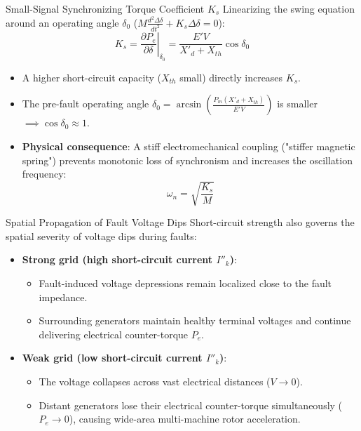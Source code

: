 \begin{frame}{Small-Signal Synchronizing Torque Coefficient $K_s$}
Linearizing the swing equation around an operating angle $\delta_0$ ($M \frac{d^2\Delta\delta}{dt^2} + K_s \Delta\delta = 0$):
$$K_s = \left.\frac{\partial P_e}{\partial\delta}\right|_{\delta_0} = \frac{E' V}{X'_d + X_{th}} \cos \delta_0$$
\begin{itemize}
    \item A higher short-circuit capacity ($X_{th}$ small) directly increases $K_s$.
    \item The pre-fault operating angle $\delta_0 = \arcsin\left(\frac{P_m(X'_d + X_{th})}{E' V}\right)$ is smaller $\implies \cos\delta_0 \approx 1$.
    \item \textbf{Physical consequence}: A stiff electromechanical coupling ("stiffer magnetic spring") prevents monotonic loss of synchronism and increases the oscillation frequency:
    $$\omega_n = \sqrt{\frac{K_s}{M}}$$
\end{itemize}
\end{frame}

\begin{frame}{Spatial Propagation of Fault Voltage Dips}
Short-circuit strength also governs the spatial severity of voltage dips during faults:
\begin{itemize}
    \item \textbf{Strong grid (high short-circuit current $I''_k$)}:
    \begin{itemize}
        \item Fault-induced voltage depressions remain localized close to the fault impedance.
        \item Surrounding generators maintain healthy terminal voltages and continue delivering electrical counter-torque $P_e$.
    \end{itemize}
    \vspace{0.2cm}
    \item \textbf{Weak grid (low short-circuit current $I''_k$)}:
    \begin{itemize}
        \item The voltage collapses across vast electrical distances ($V \to 0$).
        \item Distant generators lose their electrical counter-torque simultaneously ($P_e \to 0$), causing wide-area multi-machine rotor acceleration.
    \end{itemize}
\end{itemize}
\end{frame}

